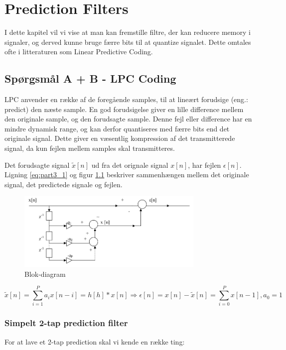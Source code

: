 \chapter{Prediction Filters}
\label{ch:part3}

I dette kapitel vil vi vise at man kan fremstille filtre, der kan reducere memory i signaler, og derved kunne bruge færre bits til at quantize signalet. Dette omtales ofte i litteraturen som Linear Predictive Coding.

\section{Spørgsmål A + B - LPC Coding}

LPC anvender en række af de foregående samples, til at lineært forudsige (eng.: predict) den næste sample. En god forudsigelse giver en lille difference mellem den originale sample, og den forudsagte sample. Denne fejl eller difference har en mindre dynamisk range, og kan derfor quantiseres med færre bits end det originale signal. Dette giver en væsentlig kompression af det transmitterede signal, da kun fejlen mellem samples skal transmitteres.

Det forudsagte signal $\tilde{x}[n]$ ud fra det orignale signal $x[n]$, har fejlen $\epsilon[n]$. Ligning \ref{eq:part3_1} og figur \ref{fig:part3_x1} beskriver sammenhængen mellem det originale signal, det predictede signale og fejlen.

\begin{figure}[!ht]
	\centering
	\includegraphics[width=0.8\textwidth]{resources/part3_block}
 	\caption{Blok-diagram}
 	\label{fig:part3_x1}
\end{figure}

\begin{equation}\label{eq:part3_1}
	\tilde{x}[n] = \sum^P_{i=1} a_i x[n-i] = h[h] * x[n] \Rightarrow \epsilon[n] = x[n] - \tilde{x}[n] = \sum^P_{i=0} x[n-1], a_0 = 1
\end{equation}

\subsection{Simpelt 2-tap prediction filter}
For at lave et 2-tap prediction skal vi kende en række ting:

